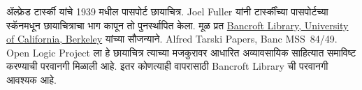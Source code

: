 ॲल्फ्रेड टार्स्की यांचे 1939 मधील पासपोर्ट छायाचित्र.
Joel Fuller यांनी टार्स्कींच्या पासपोर्टच्या स्कॅनमधून छायाचित्राचा
भाग कापून तो पुनर्स्थापित केला. मूळ प्रत
\href{https://www.lib.berkeley.edu/visit/bancroft}{Bancroft
Library, University of California, Berkeley} यांच्या सौजन्याने.
Alfred Tarski Papers, Banc MSS~84/49. Open Logic Project ला हे
छायाचित्र त्याच्या मजकुरावर आधारित अव्यावसायिक साहित्यात
समाविष्ट करण्याची परवानगी मिळाली आहे. इतर कोणत्याही वापरासाठी
Bancroft Library ची परवानगी आवश्यक आहे.
